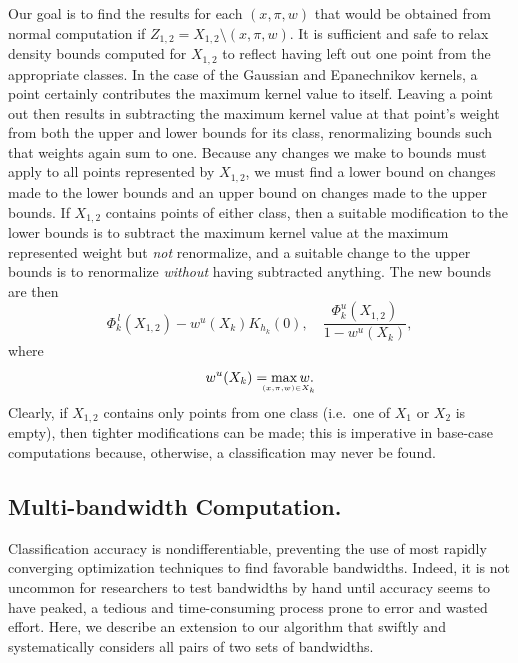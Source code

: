 \documentclass[twoside,leqno,twocolumn]{article}
\newcommand{\lo}[1]{#1^{\,l}}
\newcommand{\hi}[1]{#1^u}
\newcommand{\leftlim}[1]{\lefteqn{\scriptscriptstyle #1}}
\begin{document}
Our goal is to find the results for each $(x,\pi,w)$ that would be
obtained from normal computation if $Z_{1,2} = X_{1,2} \setminus
(x,\pi,w)$.  It is sufficient and safe to relax density bounds
computed for $X_{1,2}$ to reflect having left out one point from the
appropriate classes.  In the case of the Gaussian and Epanechnikov
kernels, a point certainly contributes the maximum kernel value to
itself.  Leaving a point out then results in subtracting the maximum
kernel value at that point's weight from both the upper and lower
bounds for its class, renormalizing bounds such that weights again sum
to one.  Because any changes we make to bounds must apply to all
points represented by $X_{1,2}$, we must find a lower bound on changes
made to the lower bounds and an upper bound on changes made to the
upper bounds.  If $X_{1,2}$ contains points of either class, then a
suitable modification to the lower bounds is to subtract the maximum
kernel value at the maximum represented weight but {\em not}
renormalize, and a suitable change to the upper bounds is to
renormalize {\em without} having subtracted anything.  The new bounds
are then
\begin{equation}
  \lo{\Phi_k}(X_{1,2}) - \hi{w}(X_k) K_{h_k}(0) , \quad \frac{\hi{\Phi_k}(X_{1,2})}{1 - \hi{w}(X_k)} ,
\end{equation}
where
\begin{equation}
  \hi{w}(X_k) = \max_{\leftlim{(x,\pi,w) \in X_k}} w .
\end{equation}
Clearly, if $X_{1,2}$ contains only points from one class (i.e.~one of
$X_1$ or $X_2$ is empty), then tighter modifications can be made; this
is imperative in base-case computations because, otherwise, a
classification may never be found.

\subsection{Multi-bandwidth Computation.}
Classification accuracy is nondifferentiable, preventing the use of
most rapidly converging optimization techniques to find favorable
bandwidths.  Indeed, it is not uncommon for researchers to test
bandwidths by hand until accuracy seems to have peaked, a tedious and
time-consuming process prone to error and wasted effort.  Here, we
describe an extension to our algorithm that swiftly and systematically
considers all pairs of two sets of bandwidths.
\end{document}
